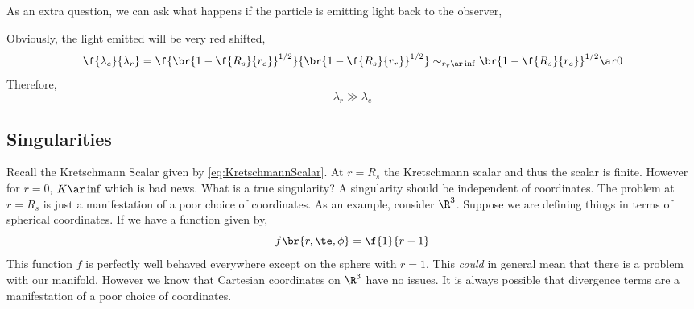 \documentclass{article}
\begin{document}
As an extra question, we can ask what happens if the particle is emitting light back to the observer,

\begin{center}
\end{center}

Obviously, the light emitted will be very red shifted,
\[ \f{\lambda_e}{\lambda_r} = \f{\br{1- \f{R_s}{r_e}}^{1/2}}{\br{1- \f{R_s}{r_r}}^{1/2}} \sim_{r_r \ar \inf} \br{1 -\f{R_s}{r_e}}^{1/2} \ar 0  \]
Therefore,
\[ \lambda_r \gg \lambda_e \]

\subsection{Singularities}

Recall the Kretschmann Scalar given by \eqref{eq:KretschmannScalar}. At $r = R_s$ the Kretschmann scalar and thus the scalar is finite. However for $r = 0$, $K \ar \inf$ which is bad news. What is a true singularity? A singularity should be independent of coordinates. The problem at $r = R_s$ is just a manifestation of a poor choice of coordinates. As an example, consider $\R^3$. Suppose we are defining things in terms of spherical coordinates. If we have a function given by,
\[ f\br{r,\te,\phi} = \f{1}{r-1} \]
This function $f$ is perfectly well behaved everywhere except on the sphere with $r = 1$. This \textit{could} in general mean that there is a problem with our manifold. However we know that Cartesian coordinates on $\R^3$ have no issues. It is always possible that divergence terms are a manifestation of a poor choice of coordinates.\\
\end{document}
